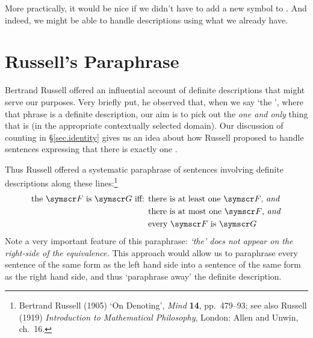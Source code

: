 More practically, it would be nice if we didn't have to add a new symbol to \FOL. And indeed, we might be able to handle descriptions using what we already have.

\section{Russell's Paraphrase}
Bertrand Russell offered an influential account of definite descriptions that might serve our purposes. Very briefly put, he observed that, when we say `the ', where that phrase is a definite description, our aim is to pick out the \emph{one and only} thing that is  (in the appropriate contextually selected domain). Our discussion of counting in §\ref{sec.identity} gives us an idea about how Russell proposed to handle sentences expressing that there is exactly one .

Thus Russell offered a systematic paraphrase of sentences involving definite descriptions along these lines:\footnote{Bertrand Russell (1905) `On Denoting', \emph{Mind} \textbf{14}, pp.\ 479–93; see also Russell (1919) \emph{Introduction to Mathematical Philosophy}, London: Allen and Unwin, ch.\ 16.}
	\begin{align*}
		\text{the \meta{F} is \meta{G}  iff: }&\text{there is at least one \meta{F}, \emph{and}}\\
	&\text{there is at most one \meta{F}, \emph{and}}\\	
	&\text{every \meta{F} is \meta{G}}
\end{align*}
Note a very important feature of this paraphrase: \emph{`the' does not appear on the right-side of the equivalence.} This approach would allow us to paraphrase every sentence of the same form as the left hand side into a sentence of the same form as the right hand side, and thus `paraphrase away' the definite description. 

